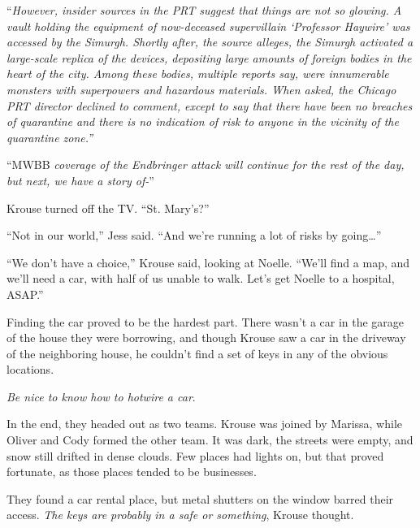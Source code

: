 ``\emph{However, insider sources in the PRT suggest that things are not so glowing.  A vault holding the equipment of now-deceased supervillain `Professor Haywire' was accessed by the Simurgh.  Shortly after, the source alleges, the Simurgh activated a large-scale replica of the devices, depositing large amounts of foreign bodies in the heart of the city.  Among these bodies, multiple reports say, were innumerable monsters with superpowers and hazardous materials.  When asked, the Chicago PRT director declined to comment, except to say that there have been no breaches of quarantine and there is no indication of risk to anyone in the vicinity of the quarantine zone.''}



``MWBB \emph{coverage of the Endbringer attack will continue for the rest of the day, but next, we have a story of-}''



Krouse turned off the TV.  ``St. Mary's?''



``Not in our world,'' Jess said.  ``And we're running a lot of risks by going\ldots''



``We don't have a choice,'' Krouse said, looking at Noelle. ``We'll find a map, and we'll need a car, with half of us unable to walk.  Let's get Noelle to a hospital, ASAP.''



\blacksquare



Finding the car proved to be the hardest part.  There wasn't a car in the garage of the house they were borrowing, and though Krouse saw a car in the driveway of the neighboring house, he couldn't find a set of keys in any of the obvious locations.



\emph{Be nice to know how to hotwire a car}.



In the end, they headed out as two teams.  Krouse was joined by Marissa, while Oliver and Cody formed the other team.  It was dark, the streets were empty, and snow still drifted in dense clouds.  Few places had lights on, but that proved fortunate, as those places tended to be businesses.



They found a car rental place, but metal shutters on the window barred their access.  \emph{The keys are probably in a safe or something}, Krouse thought.



